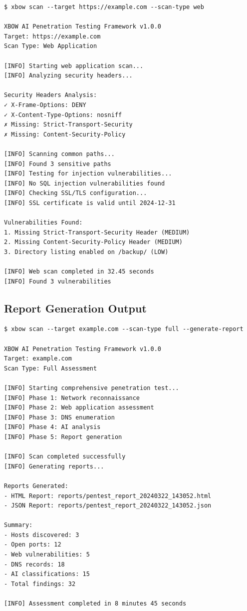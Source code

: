\documentclass[12pt,a4paper]{report}
\begin{document}
\begin{lstlisting}[caption=Web Scan Sample Output]
$ xbow scan --target https://example.com --scan-type web

XBOW AI Penetration Testing Framework v1.0.0
Target: https://example.com
Scan Type: Web Application

[INFO] Starting web application scan...
[INFO] Analyzing security headers...

Security Headers Analysis:
✓ X-Frame-Options: DENY
✓ X-Content-Type-Options: nosniff
✗ Missing: Strict-Transport-Security
✗ Missing: Content-Security-Policy

[INFO] Scanning common paths...
[INFO] Found 3 sensitive paths
[INFO] Testing for injection vulnerabilities...
[INFO] No SQL injection vulnerabilities found
[INFO] Checking SSL/TLS configuration...
[INFO] SSL certificate is valid until 2024-12-31

Vulnerabilities Found:
1. Missing Strict-Transport-Security Header (MEDIUM)
2. Missing Content-Security-Policy Header (MEDIUM)
3. Directory listing enabled on /backup/ (LOW)

[INFO] Web scan completed in 32.45 seconds
[INFO] Found 3 vulnerabilities
\end{lstlisting}

\subsection{Report Generation Output}

\begin{lstlisting}[caption=Report Generation Sample]
$ xbow scan --target example.com --scan-type full --generate-report

XBOW AI Penetration Testing Framework v1.0.0
Target: example.com
Scan Type: Full Assessment

[INFO] Starting comprehensive penetration test...
[INFO] Phase 1: Network reconnaissance
[INFO] Phase 2: Web application assessment
[INFO] Phase 3: DNS enumeration
[INFO] Phase 4: AI analysis
[INFO] Phase 5: Report generation

[INFO] Scan completed successfully
[INFO] Generating reports...

Reports Generated:
- HTML Report: reports/pentest_report_20240322_143052.html
- JSON Report: reports/pentest_report_20240322_143052.json

Summary:
- Hosts discovered: 3
- Open ports: 12
- Web vulnerabilities: 5
- DNS records: 18
- AI classifications: 15
- Total findings: 32

[INFO] Assessment completed in 8 minutes 45 seconds
\end{lstlisting}
\end{document}

